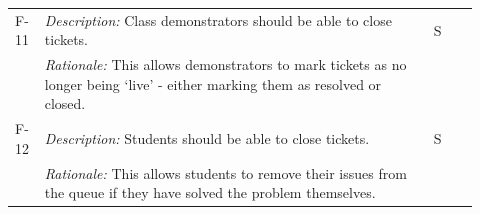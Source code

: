 \begin{table}[H]
\begin{tabular}{|p{0.05\linewidth} | p{0.78\linewidth} |p{0.09\linewidth}|}
    \hline\hline
 F-11 & \textit{Description:} Class demonstrators should be able to close tickets. & S\\
  \cline{2-2}
  & \textit{Rationale:} This allows demonstrators to mark tickets as no longer being `live' - either marking them as resolved or closed. & \\

  
      \hline\hline
 F-12 & \textit{Description:} Students should be able to close tickets. & S\\
  \cline{2-2}
  & \textit{Rationale:} This allows students to remove their issues from the queue if they have solved the problem themselves. & \\
\hline



  \end{tabular}
\end{table}

